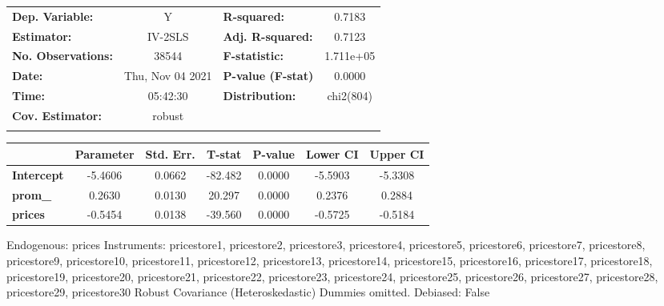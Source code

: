 \begin{center}
\begin{tabular}{lclc}
\toprule
\textbf{Dep. Variable:}                        &         Y          & \textbf{  R-squared:         } &      0.7183      \\
\textbf{Estimator:}                            &      IV-2SLS       & \textbf{  Adj. R-squared:    } &      0.7123      \\
\textbf{No. Observations:}                     &       38544        & \textbf{  F-statistic:       } &    1.711e+05     \\
\textbf{Date:}                                 &  Thu, Nov 04 2021  & \textbf{  P-value (F-stat)   } &      0.0000      \\
\textbf{Time:}                                 &      05:42:30      & \textbf{  Distribution:      } &    chi2(804)     \\
\textbf{Cov. Estimator:}                       &       robust       & \textbf{                     } &                  \\
\textbf{}                                      &                    & \textbf{                     } &                  \\
\bottomrule
\end{tabular}
\begin{tabular}{lcccccc}
                                               & \textbf{Parameter} & \textbf{Std. Err.} & \textbf{T-stat} & \textbf{P-value} & \textbf{Lower CI} & \textbf{Upper CI}  \\
\midrule
\textbf{Intercept}                             &      -5.4606       &       0.0662       &     -82.482     &      0.0000      &      -5.5903      &      -5.3308       \\
\textbf{prom\_}                                &       0.2630       &       0.0130       &      20.297     &      0.0000      &       0.2376      &       0.2884       \\
\textbf{prices}                                &      -0.5454       &       0.0138       &     -39.560     &      0.0000      &      -0.5725      &      -0.5184       \\
\bottomrule
\end{tabular}
\end{center}

Endogenous: prices \newline
 Instruments: pricestore1, pricestore2, pricestore3, pricestore4, pricestore5, pricestore6, pricestore7, pricestore8, pricestore9, pricestore10, pricestore11, pricestore12, pricestore13, pricestore14, pricestore15, pricestore16, pricestore17, pricestore18, pricestore19, pricestore20, pricestore21, pricestore22, pricestore23, pricestore24, pricestore25, pricestore26, pricestore27, pricestore28, pricestore29, pricestore30 \newline
 Robust Covariance (Heteroskedastic) Dummies omitted.\newline
 Debiased: False
